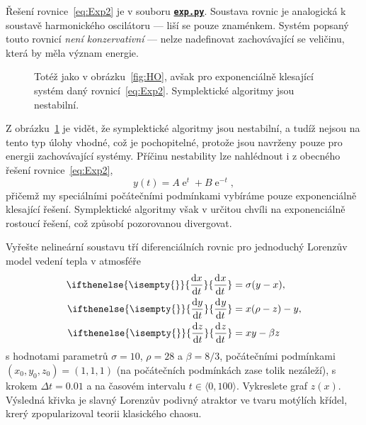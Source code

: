 \documentclass[a4paper,11pt,twoside]{article}
\DeclareMathOperator{\e}{e}
\renewcommand{\d}{\mathrm{d}}
\newcommand{\derivative}[3][]{\ifthenelse{\isempty{#1}}	    %
	{\frac{\d{#2}}{\d{#3}}}
	{\frac{\d^{#1}{#2}}{\d{#3}^{#1}}}
}
\def\ghfile#1#2{\textnormal{\textbf{\texttt{\href{https://github.com/PavelStransky/PCInPhysics/blob/main/#1#2}{#2}}}}}
\theoremstyle{red}
\theoremstyle{green}
\begin{document}
\begin{solution}
    Řešení rovnice~\eqref{eq:Exp2} je v souboru \ghfile{python/ode/}{exp.py}.
    Soustava rovnic je analogická k soustavě harmonického oscilátoru --- liší se pouze znaménkem.
    Systém popsaný touto rovnicí \emph{není konzervativní} --- nelze nadefinovat zachovávající se veličinu, která by měla význam energie.

    \begin{figure}[!htbp]
        \centering
        \caption{
            \protect\small
            Totéž jako v obrázku~\ref{fig:HO}, avšak pro exponenciálně klesající systém daný rovnicí~\eqref{eq:Exp2}.
            Symplektické algoritmy jsou nestabilní.
            }	
        \label{fig:Exp2}
    \end{figure}
    
    Z obrázku~\ref{fig:Exp2} je vidět, že symplektické algoritmy jsou nestabilní, a tudíž nejsou na tento typ úlohy vhodné, což je pochopitelné, protože jsou navrženy pouze pro energii zachovávající systémy.
    Příčinu nestability lze nahlédnout i z obecného řešení rovnice~\eqref{eq:Exp2},
    \begin{equation}
        y(t)=A\e^{t}+B\e^{-t},
    \end{equation}
    přičemž my speciálními počátečními podmínkami vybíráme pouze exponenciálně klesající řešení.
    Symplektické algoritmy však v určitou chvíli  na exponenciálně rostoucí řešení, což způsobí pozorovanou divergovat.
\end{solution}

\begin{task}
    Vyřešte nelineární soustavu tří diferenciálních rovnic pro jednoduchý Lorenzův model vedení tepla v atmosféře
    \begin{align}
        \derivative{x}{t}&=\sigma(y-x),\nonumber\\
        \label{eq:Lorenz}
        \derivative{y}{t}&=x(\rho-z)-y,\\
        \derivative{z}{t}&=xy-\beta z\nonumber
    \end{align}
    s hodnotami parametrů $\sigma=10$, $\rho=28$ a $\beta=8/3$, počátečními podmínkami $(x_0, y_0, z_0)=(1,1,1)$ (na počátečních podmínkách zase tolik nezáleží), s krokem $\Delta t=0.01$ a na časovém intervalu $t\in\langle0,100\rangle$.
    Vykreslete graf $z(x)$.
    Výsledná křivka je slavný Lorenzův podivný atraktor ve tvaru motýlích křídel, krerý zpopularizoval teorii klasického chaosu.
\end{task}
\end{document}
